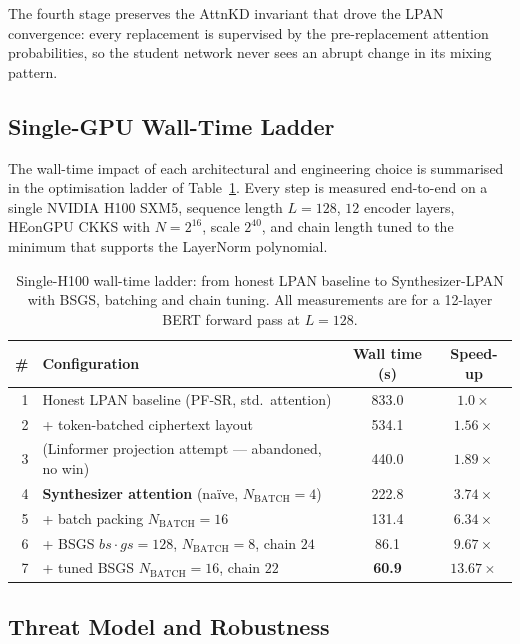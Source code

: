 The fourth stage preserves the AttnKD invariant that drove the LPAN convergence: every replacement is supervised by the pre-replacement attention probabilities, so the student network never sees an abrupt change in its mixing pattern.

\subsection{Single-GPU Wall-Time Ladder}
\label{sec:walltime_ladder}

The wall-time impact of each architectural and engineering choice is summarised in the optimisation ladder of Table~\ref{tab:walltime_ladder}. Every step is measured end-to-end on a single NVIDIA H100 SXM5, sequence length $L = 128$, $12$ encoder layers, HEonGPU CKKS with $N = 2^{16}$, scale $2^{40}$, and chain length tuned to the minimum that supports the LayerNorm polynomial.

\begin{table}[htbp]
\centering
\caption{Single-H100 wall-time ladder: from honest LPAN baseline to Synthesizer-LPAN with BSGS, batching and chain tuning. All measurements are for a 12-layer BERT forward pass at $L = 128$.}
\label{tab:walltime_ladder}
\begin{tabular}{rlcc}
\toprule
\# & \textbf{Configuration} & \textbf{Wall time (s)} & \textbf{Speed-up} \\
\midrule
1 & Honest LPAN baseline (PF-SR, std.\ attention)            & 833.0 & $1.0\times$ \\
2 & + token-batched ciphertext layout                         & 534.1 & $1.56\times$ \\
3 & (Linformer projection attempt --- abandoned, no win)      & 440.0 & $1.89\times$ \\
4 & \textbf{Synthesizer attention} (na\"ive, $N_{\mathrm{BATCH}}{=}4$) & 222.8 & $3.74\times$ \\
5 & + batch packing $N_{\mathrm{BATCH}}{=}16$                 & 131.4 & $6.34\times$ \\
6 & + BSGS $bs \cdot gs = 128$, $N_{\mathrm{BATCH}}{=}8$, chain $24$ &  86.1 & $9.67\times$ \\
7 & + tuned BSGS $N_{\mathrm{BATCH}}{=}16$, chain $22$        & \textbf{60.9} & $\mathbf{13.67\times}$ \\
\bottomrule
\end{tabular}
\end{table}

\subsection{Threat Model and Robustness}

